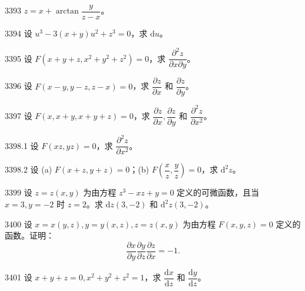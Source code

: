 \begin{prob}[S]{3393}
$z = x + \arctan\dfrac{y}{z - x}$。
\end{prob}

\begin{prob}[S]{3394}
设 $u^3 - 3(x + y)u^2 + z^3 = 0$，求 $\mathrm{d}u$。
\end{prob}

\begin{prob}[S]{3395}
设 $F(x + y + z, x^2 + y^2 + z^2) = 0$，求 $\dfrac{\partial^2 z}{\partial x \partial y}$。
\end{prob}

\begin{prob}[S]{3396}
设 $F(x - y, y - z, z - x) = 0$，求 $\dfrac{\partial z}{\partial x}$ 和 $\dfrac{\partial z}{\partial y}$。
\end{prob}

\begin{prob}[S]{3397}
设 $F(x, x + y, x + y + z) = 0$，求 $\dfrac{\partial z}{\partial x}, \dfrac{\partial z}{\partial y}$ 和 $\dfrac{\partial^2 z}{\partial x^2}$。
\end{prob}

\begin{prob}[S]{3398.1}
设 $F(xz, yz) = 0$，求 $\dfrac{\partial^2 z}{\partial x^2}$。
\end{prob}

\begin{prob}[M]{3398.2}
设 (a) $F(x + z, y + z) = 0$；\qquad (b) $F\left(\dfrac{x}{z}, \dfrac{y}{z}\right) = 0$，求 $\mathrm{d}^2 z$。
\end{prob}

\begin{prob}[M]{3399}
设 $z = z(x, y)$ 为由方程 $z^3 - xz + y = 0$ 定义的可微函数，且当 $x = 3, y = -2$ 时 $z = 2$。求 $\mathrm{d}z(3, -2)$ 和 $\mathrm{d}^2 z(3, -2)$。
\end{prob}

\begin{prob}[M]{3400}
设 $x = x(y, z), y = y(x, z), z = z(x, y)$ 为由方程 $F(x, y, z) = 0$ 定义的函数。证明：
\[
\frac{\partial x}{\partial y}\frac{\partial y}{\partial z}\frac{\partial z}{\partial x} = -1.
\]
\end{prob}

\begin{prob}[S]{3401}
设 $x + y + z = 0, x^2 + y^2 + z^2 = 1$，求 $\dfrac{\mathrm{d}x}{\mathrm{d}z}$ 和 $\dfrac{\mathrm{d}y}{\mathrm{d}z}$。
\end{prob}

